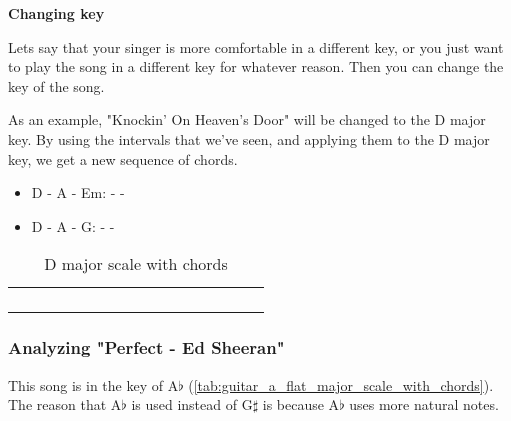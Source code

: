 \textbf{Changing key}

Lets say that your singer is more comfortable in a different key, or you just want to play the song in a different key for whatever reason. Then you can change the key of the song.

As an example, "Knockin' On Heaven's Door" will be changed to the D major key. By using the intervals that we've seen, and applying them to the D major key, we get a new sequence of chords.

\begin{itemize}
	\item D - A - Em:  -  - 
	\item D - A - G:  -  -  
\end{itemize}

\begin{table}[h]
	\centering
	\begin{NiceTabular}{*{16}{P{0.05mm}}}
		\Block{}{} &  & &  & &  & &  & &  & &  & &  & & \Block{}{} \\
		 & &  & &  & &  & &  & &  & &  & &  & \\
		 & &  & &  & &  & &  & &  & &  & & \\
		 & &  & &  & &  & &  & &  & &  & &  &
	\end{NiceTabular}
	\caption{D major scale with chords}
	\label{tab:guitar_D_major_scale_with_chords}
\end{table}

\subsubsection{Analyzing "Perfect - Ed Sheeran"}

This song is in the key of A$\flat$ (\autoref{tab:guitar_a_flat_major_scale_with_chords}). The reason that A$\flat$ is used instead of G$\sharp$ is because A$\flat$ uses more natural notes.

